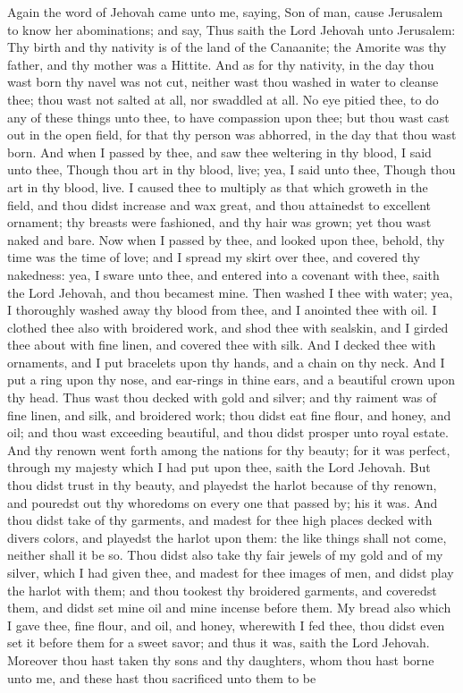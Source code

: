Again the word of Jehovah came unto me, saying, Son of man, cause Jerusalem to know her abominations; and say, Thus saith the Lord Jehovah unto Jerusalem: Thy birth and thy nativity is of the land of the Canaanite; the Amorite was thy father, and thy mother was a Hittite. And as for thy nativity, in the day thou wast born thy navel was not cut, neither wast thou washed in water to cleanse thee; thou wast not salted at all, nor swaddled at all. No eye pitied thee, to do any of these things unto thee, to have compassion upon thee; but thou wast cast out in the open field, for that thy person was abhorred, in the day that thou wast born.  And when I passed by thee, and saw thee weltering in thy blood, I said unto thee, Though thou art in thy blood, live; yea, I said unto thee, Though thou art in thy blood, live. I caused thee to multiply as that which groweth in the field, and thou didst increase and wax great, and thou attainedst to excellent ornament; thy breasts were fashioned, and thy hair was grown; yet thou wast naked and bare. Now when I passed by thee, and looked upon thee, behold, thy time was the time of love; and I spread my skirt over thee, and covered thy nakedness: yea, I sware unto thee, and entered into a covenant with thee, saith the Lord Jehovah, and thou becamest mine. Then washed I thee with water; yea, I thoroughly washed away thy blood from thee, and I anointed thee with oil. I clothed thee also with broidered work, and shod thee with sealskin, and I girded thee about with fine linen, and covered thee with silk. And I decked thee with ornaments, and I put bracelets upon thy hands, and a chain on thy neck. And I put a ring upon thy nose, and ear-rings in thine ears, and a beautiful crown upon thy head. Thus wast thou decked with gold and silver; and thy raiment was of fine linen, and silk, and broidered work; thou didst eat fine flour, and honey, and oil; and thou wast exceeding beautiful, and thou didst prosper unto royal estate. And thy renown went forth among the nations for thy beauty; for it was perfect, through my majesty which I had put upon thee, saith the Lord Jehovah.  But thou didst trust in thy beauty, and playedst the harlot because of thy renown, and pouredst out thy whoredoms on every one that passed by; his it was. And thou didst take of thy garments, and madest for thee high places decked with divers colors, and playedst the harlot upon them: the like things shall not come, neither shall it be so. Thou didst also take thy fair jewels of my gold and of my silver, which I had given thee, and madest for thee images of men, and didst play the harlot with them; and thou tookest thy broidered garments, and coveredst them, and didst set mine oil and mine incense before them. My bread also which I gave thee, fine flour, and oil, and honey, wherewith I fed thee, thou didst even set it before them for a sweet savor; and thus it was, saith the Lord Jehovah. Moreover thou hast taken thy sons and thy daughters, whom thou hast borne unto me, and these hast thou sacrificed unto them to be 